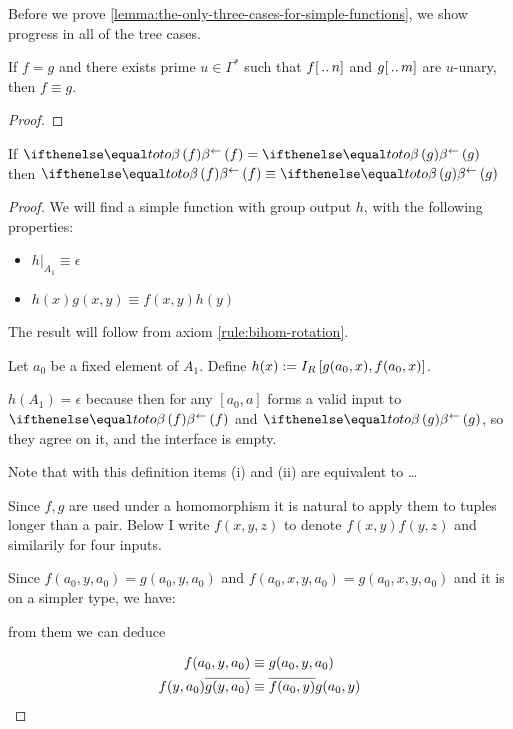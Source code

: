 Before we prove \cref{lemma:the-only-three-cases-for-simple-functions}, we show progress in all of the tree cases.

\begin{claim}\label{claim:progress_for_unary}
    If $f = g$ and there exists prime $u \in \Gamma^*$ such that $f[\,..\,n]$ and $g[\,..\,m]$ are $u$-unary, then $f \equiv g$.
\end{claim}

\begin{proof}
\end{proof}


\begin{lemma}\label{lem:bihom-equality-is-provable}
    If $\bihom{to, f} = \bihom{to, g}$ then $\bihom{to, f} \equiv \bihom{to, g}$
\end{lemma}
\begin{proof}
    We will find a simple function with group output $h$, with the following properties:
    \begin{itemize}
        \item  ${h|}_{A_1} \equiv \epsilon$
        \item  $h(x)g(x, y) \equiv f(x, y)h(y)$
    \end{itemize}

    The result will follow from axiom \cref{rule:bihom-rotation}.

    Let $a_0$ be a fixed element of $A_1$.
    Define $h(x) := I_R \left[ g(a_0, x), f(a_0, x) \right]$.

    $h(A_1) = \epsilon$ because then for any $[a_0, a]$ forms a valid input to $\bihom{to, f}$ and $\bihom{to, g}$, so they agree on it, and the interface is empty.

    Note that with this definition items (i) and (ii) are equivalent to \dots {}

    Since $f, g$ are used under a homomorphism it is natural to apply them to tuples longer than a pair. Below I write $f(x, y, z)$ to denote $f(x, y)f(y, z)$ and similarily for four inputs.

    Since $f(a_0, y, a_0) = g(a_0, y, a_0)$  and $f(a_0, x, y, a_0) = g(a_0, x, y, a_0)$ and it is on a simpler type, we have:


    from them we can deduce

    \begin{align}
        f(a_0, y, a_0)           & \equiv g(a_0, y, a_0)\notag                               \\
        f(y, a_0)\overline{g(y, a_0)} & \equiv \overline{f(a_0, y)}g(a_0, y) \label{eq:3-element-list}
    \end{align}


\end{proof}
